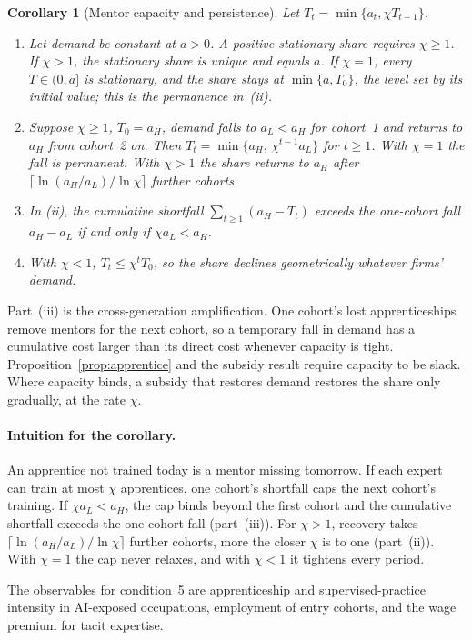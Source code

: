 \documentclass[12pt]{article}
\newtheorem{corollary}{Corollary}
\theoremstyle{remark}
\begin{document}
\begin{corollary}[Mentor capacity and persistence]\label{cor:capacity}
Let $T_t=\min\{a_t,\chi T_{t-1}\}$.
\begin{enumerate}[label=(\roman*),itemsep=0pt]
\item Let demand be constant at $a>0$. A positive stationary share requires $\chi\ge1$. If $\chi>1$, the stationary share is unique and equals $a$. If $\chi=1$, every $T\in(0,a]$ is stationary, and the share stays at $\min\{a,T_0\}$, the level set by its initial value; this is the permanence in~(ii).
\item Suppose $\chi\ge1$, $T_0=a_H$, demand falls to $a_L<a_H$ for cohort~1 and returns to $a_H$ from cohort~2 on. Then $T_t=\min\{a_H,\,\chi^{t-1}a_L\}$ for $t\ge1$. With $\chi=1$ the fall is permanent. With $\chi>1$ the share returns to $a_H$ after $\lceil\ln(a_H/a_L)/\ln\chi\rceil$ further cohorts.
\item In (ii), the cumulative shortfall $\sum_{t\ge1}(a_H-T_t)$ exceeds the one-cohort fall $a_H-a_L$ if and only if $\chi a_L<a_H$.
\item With $\chi<1$, $T_t\le\chi^tT_0$, so the share declines geometrically whatever firms' demand.
\end{enumerate}
\end{corollary}

Part~(iii) is the cross-generation amplification. One cohort's lost apprenticeships remove mentors for the next cohort, so a temporary fall in demand has a cumulative cost larger than its direct cost whenever capacity is tight. Proposition~\ref{prop:apprentice} and the subsidy result require capacity to be slack. Where capacity binds, a subsidy that restores demand restores the share only gradually, at the rate $\chi$.

\paragraph{Intuition for the corollary.} An apprentice not trained today is a mentor missing tomorrow. If each expert can train at most $\chi$ apprentices, one cohort's shortfall caps the next cohort's training. If $\chi a_L<a_H$, the cap binds beyond the first cohort and the cumulative shortfall exceeds the one-cohort fall (part~(iii)). For $\chi>1$, recovery takes $\lceil\ln(a_H/a_L)/\ln\chi\rceil$ further cohorts, more the closer $\chi$ is to one (part~(ii)). With $\chi=1$ the cap never relaxes, and with $\chi<1$ it tightens every period.

The observables for condition~5 are apprenticeship and supervised-practice intensity in AI-exposed occupations, employment of entry cohorts, and the wage premium for tacit expertise.
\end{document}
